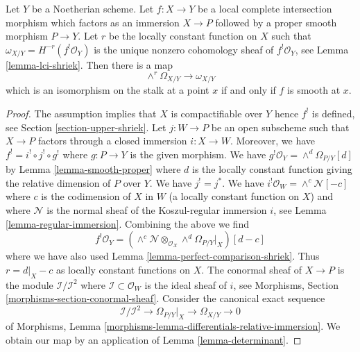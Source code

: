 \begin{lemma}
\label{lemma-fundamental-class-lci}
Let $Y$ be a Noetherian scheme. Let $f : X \to Y$ be a
local complete intersection morphism which factors
as an immersion $X \to P$ followed by a proper smooth morphism $P \to Y$.
Let $r$ be the locally constant function on
$X$ such that $\omega_{X/Y} = H^{-r}(f^!\mathcal{O}_Y)$
is the unique nonzero cohomology sheaf of $f^!\mathcal{O}_Y$, see
Lemma \ref{lemma-lci-shriek}.
Then there is a map
$$
\wedge^r\Omega_{X/Y} \longrightarrow \omega_{X/Y}
$$
which is an isomorphism on the stalk at a point $x$ if and only
if $f$ is smooth at $x$.
\end{lemma}

\begin{proof}
The assumption implies that $X$ is compactifiable over $Y$ hence $f^!$
is defined, see Section \ref{section-upper-shriek}.
Let $j : W \to P$ be an open subscheme such that
$X \to P$ factors through a closed immersion $i : X \to W$.
Moreover, we have $f^! = i^! \circ j^! \circ g^!$ where
$g : P \to Y$ is the given morphism.
We have $g^!\mathcal{O}_Y = \wedge^d\Omega_{P/Y}[d]$ by
Lemma \ref{lemma-smooth-proper} where $d$ is the locally
constant function giving the relative dimension of $P$ over $Y$.
We have $j^! = j^*$. We have $i^!\mathcal{O}_W = \wedge^c\mathcal{N}[-c]$
where $c$ is the codimension of $X$ in $W$ (a locally constant
function on $X$) and where $\mathcal{N}$ is the normal sheaf of
the Koszul-regular immersion $i$, see Lemma \ref{lemma-regular-immersion}.
Combining the above we find
$$
f^!\mathcal{O}_Y =
\left(\wedge^c\mathcal{N} \otimes_{\mathcal{O}_X}
\wedge^d\Omega_{P/Y}|_X\right)[d - c]
$$
where we have also used Lemma \ref{lemma-perfect-comparison-shriek}.
Thus $r = d|_X - c$ as locally constant functions on $X$.
The conormal sheaf of $X \to P$ is the module
$\mathcal{I}/\mathcal{I}^2$ where $\mathcal{I} \subset \mathcal{O}_W$
is the ideal sheaf of $i$, see
Morphisms, Section \ref{morphisms-section-conormal-sheaf}.
Consider the canonical exact sequence
$$
\mathcal{I}/\mathcal{I}^2 \to
\Omega_{P/Y}|_X \to \Omega_{X/Y} \to 0
$$
of Morphisms, Lemma \ref{morphisms-lemma-differentials-relative-immersion}.
We obtain our map by an application of Lemma \ref{lemma-determinant}.


\end{proof}
